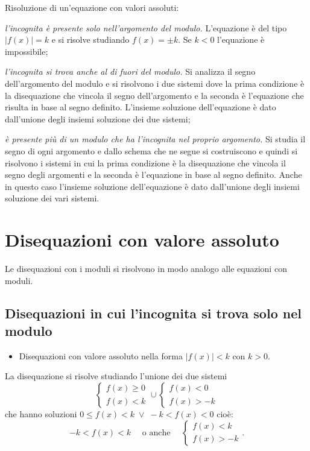\begin{procedura} {Risoluzione di un'equazione con valori assoluti:}
\begin{enumeratea}
\item \emph{l'incognita è presente solo nell'argomento del modulo.} L'equazione è del tipo $\left|f(x)\right|=k$ e si risolve studiando $f(x)=\pm k$. Se $k<0$ l'equazione è impossibile;
\item \emph{l'incognita si trova anche al di fuori del modulo.} Si analizza il segno dell'argomento del modulo e si risolvono i due sistemi dove la prima condizione è la disequazione che vincola il segno dell'argomento e la seconda è l'equazione che risulta in base al segno definito. L'insieme soluzione dell'equazione è dato dall'unione degli insiemi soluzione dei due sistemi;
\item \emph{è presente più di un modulo che ha l'incognita nel proprio argomento.} Si studia il segno di ogni argomento e dallo schema che ne segue si costruiscono e quindi si risolvono i sistemi in cui la prima condizione è la disequazione che vincola il segno degli argomenti e la seconda è l'equazione in base al segno definito. Anche in questo caso l'insieme soluzione dell'equazione è dato dall'unione degli insiemi soluzione dei vari sistemi.
\end{enumeratea}
\end{procedura}
\ovalbox{\risolvii \ref{ese:7.17}, \ref{ese:7.18}, \ref{ese:7.19}, \ref{ese:7.20}, \ref{ese:7.21}, \ref{ese:7.22}, \ref{ese:7.23}, \ref{ese:7.24}, \ref{ese:7.25}, \ref{ese:7.26}, \ref{ese:7.27}, \ref{ese:7.28}, \ref{ese:7.29}, \ref{ese:7.30}}

\section{Disequazioni con valore assoluto}
Le disequazioni con i moduli si risolvono in modo analogo alle equazioni con moduli.

\subsection{Disequazioni in cui l'incognita si trova solo nel modulo}

\begin{itemize}
\item Disequazioni con valore assoluto nella forma $\left|f(x)\right|<k \text{ con }  k>0 $.
\end{itemize}

La disequazione si risolve studiando l'unione dei due sistemi 
\[\left\{\begin{array}{l}{f(x)\ge 0}\\{f(x)<k}\end{array}\right.\cup\left\{\begin{array}{l}{f(x)< 0}\\{f(x)>-k}\end{array}\right.\]
che hanno soluzioni $ 0\le f(x)<k\;\vee\; -k<f(x)<0 $ cioè:
\[-k<f(x)<k\quad \text{ o anche }\quad\left\{\begin{array}{l}{f(x)< k}\\{f(x)>-k}\end{array}\right..\]

